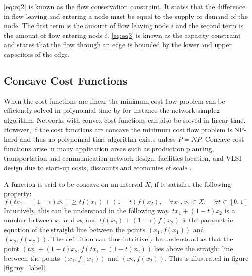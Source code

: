 \autoref{eq:eq2} is known as the flow conservation constraint. It states that the difference in flow leaving and entering a node must be equal to the supply or demand of the node. The first term is the amount of flow leaving node $i$ and the second term is the amount of flow entering node $i$. \autoref{eq:eq3} is known as the capacity constraint and states that the flow through an edge is bounded by the lower and upper capacities of the edge.

\subsection{Concave Cost Functions}

When the cost functions are linear the minimum cost flow problem can be efficiently solved in polynomial time by for instance the network simplex algorithm. Networks with convex cost functions can also be solved in linear time. However, if the cost functions are concave the minimum cost flow problem is NP-hard and thus no polynomial time algorithm exists unless $P=NP$. Concave cost functions arise in many application areas such as production planning, transportation and communication network design, facilities location, and VLSI design due to start-up costs, discounts and economies of scale \parencite[77]{Guisewite1990}.

A function is said to be concave on an interval $X$, if it satisfies the following property:
\begin{equation}
f(tx_1+(1-t)x_2) \geq tf(x_1)+(1-t)f(x_2), \quad \forall x_1,x_2 \in X, \quad \forall t \in [0,1]
\end{equation}
Intuitively, this can be understood in the following way. $tx_1+(1-t)x_2$ is a number between $x_1$ and $x_2$ and $tf(x_1)+(1-t)f(x_2)$ is the parametric equation of the straight line between the points $(x_1,f(x_1))$ and $(x_2,f(x_2))$. The definition can thus intuitively be understood as that the point $(tx_1+(1-t)x_2,f(tx_1+(1-t)x_2))$ lies above the straight line between the points $(x_1,f(x_1))$ and $(x_2,f(x_2))$. This is illustrated in figure \ref{fig:my_label}.

